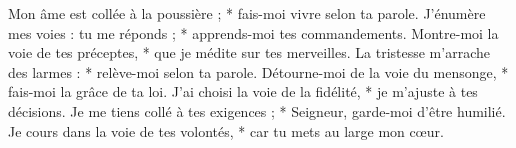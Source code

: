 Mon âme est collée à la poussière ; *
fais-moi vivre selon ta parole.
\versseparator
J’énumère mes voies : tu me réponds ; *
apprends-moi tes commandements.
\versseparator
Montre-moi la voie de tes préceptes, *
que je médite sur tes merveilles.
\versseparator
La tristesse m’arrache des larmes : *
relève-moi selon ta parole.
\versseparator
Détourne-moi de la voie du mensonge, *
fais-moi la grâce de ta loi.
\versseparator
J’ai choisi la voie de la fidélité, *
je m’ajuste à tes décisions.
\versseparator
Je me tiens collé à tes exigences ; *
Seigneur, garde-moi d’être humilié.
\versseparator
Je cours dans la voie de tes volontés, *
car tu mets au large mon cœur.

